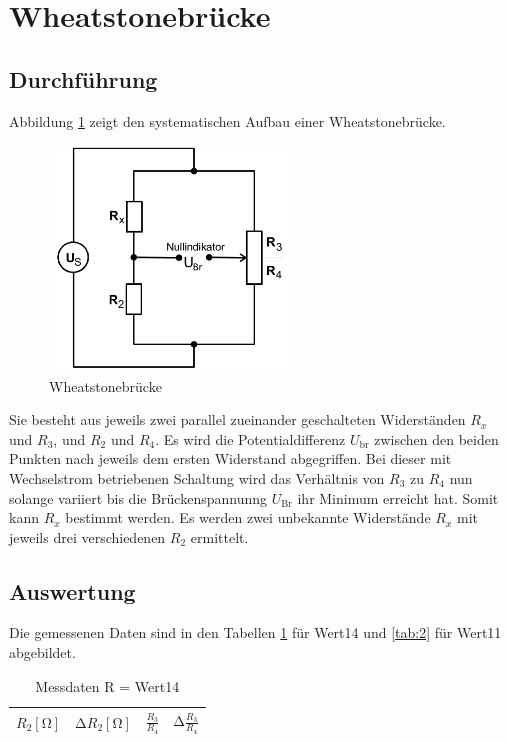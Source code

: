 \section{Wheatstonebrücke}
\subsection{Durchführung}
Abbildung \ref{fig:1} zeigt den systematischen Aufbau einer Wheatstonebrücke.
\begin{figure}[H]
  \centering
  \includegraphics[height=6cm]{wheat.png}
  \caption{Wheatstonebrücke \cite{sample}}
  \label{fig:1}
\end{figure}
Sie besteht aus jeweils zwei parallel zueinander geschalteten Widerständen $R_x$ und $R_3$, und $R_2$ und $R_4$.
Es wird die Potentialdifferenz $U_{\text{br}}$ zwischen den beiden Punkten nach jeweils dem ersten Widerstand abgegriffen.
Bei dieser mit Wechselstrom betriebenen Schaltung wird das Verhältnis von $R_3$ zu $R_4$ nun solange variiert bis die Brückenspannunng $U_{\text{Br}}$ ihr Minimum erreicht hat.
Somit kann $R_x$ bestimmt werden.
Es werden zwei unbekannte Widerstände $R_x$ mit jeweils drei verschiedenen $R_2$ ermittelt.
\subsection{Auswertung}
Die gemessenen Daten sind in den Tabellen \ref{tab:1} für Wert14 und \ref{tab:2} für Wert11 abgebildet.
\begin{table}
  \centering
  \caption{Messdaten R = Wert14}
  \label{tab:1}
  \begin{tabular}{c c c c}
    \toprule
    {$R_2 [\si{\ohm}]$} & {$\increment R_2 [\si{\ohm}]$} & {$\frac{R_3}{R_4}$} & {$\increment \frac{R_3}{R_4}$} \\
    \midrule
    
    \bottomrule
  \end{tabular}
\end{table}


